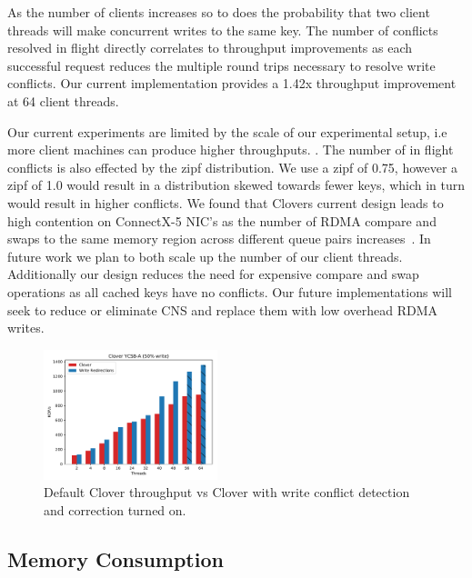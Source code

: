 As the number of clients increases so to does the probability that two
client threads will make concurrent writes to the same key. The number
of conflicts resolved in flight directly correlates to throughput
improvements as each successful request reduces the multiple round
trips necessary to resolve write conflicts. Our current implementation
provides a 1.42x throughput improvement at 64 client threads.

Our current experiments are limited by the scale of our experimental
setup, i.e more client machines can produce higher throughputs.
. 
The number of in flight conflicts is also effected by the zipf
distribution. We use a zipf of 0.75, however a zipf of 1.0 would
result in a distribution skewed towards fewer keys, which in turn
would result in higher conflicts. We found that Clovers current design
leads to high contention on ConnectX-5 NIC's as the number of RDMA
compare and swaps to the same memory region across different queue
pairs increases~\cite{design-guidelines}. In future work we plan to
both scale up the number of our client threads. Additionally our
design reduces the need for expensive compare and swap operations as
all cached keys have no conflicts. Our future implementations will
seek to reduce or eliminate CNS and replace them with low overhead
RDMA writes.

\begin{figure}
    \includegraphics[width=0.45\textwidth]{fig/throughput.pdf}
    \caption{Default Clover throughput vs Clover with write conflict
    detection and correction turned on.}
    \label{fig:throughput}
\end{figure}

\subsection{Memory Consumption}

